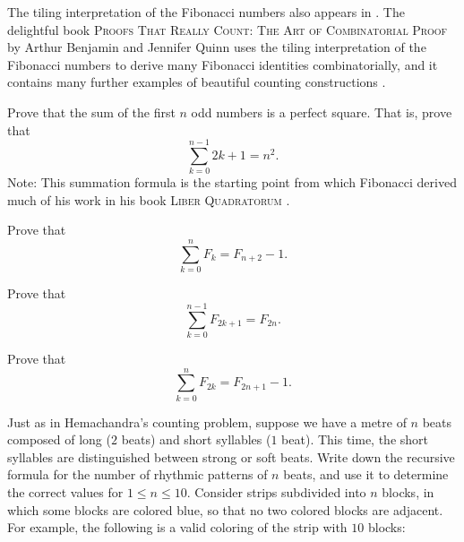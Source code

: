 The tiling interpretation of the Fibonacci numbers also appears in \cite{brigham1996}. The delightful book \textsc{Proofs That Really Count: The Art of Combinatorial Proof} by Arthur Benjamin and Jennifer Quinn uses the tiling interpretation of the Fibonacci numbers to derive many Fibonacci identities combinatorially, and it contains many further examples of beautiful counting constructions \cite{benjamin2003}.

\clearpage%

\exercises

\begin{starter}
  \exercise \label{exercise:sum-of-odd-numbers}Prove that the sum of the first $n$ odd numbers is a perfect square. That is, prove that
  \begin{equation*}
    \sum_{k=0}^{n-1} 2k+1 = n^2.
  \end{equation*}
  Note: This summation formula is the starting point from which Fibonacci derived much of his work in his book  \textsc{Liber Quadratorum} \cite{fibonacci1987}.
  \exercise
  \begin{subexenum}
  \item Prove that
    \begin{equation*}
      \sum_{k=0}^nF_k = F_{n+2}-1.
    \end{equation*}
  \item Prove that
    \begin{equation*}
      \sum_{k=0}^{n-1}F_{2k+1}=F_{2n}.
    \end{equation*}
  \item Prove that
    \begin{equation*}
      \sum_{k=0}^{n}F_{2k}=F_{2n+1}-1.
    \end{equation*}
  \end{subexenum}  
  \exercise Just as in Hemachandra's counting problem, suppose we have a metre of $n$ beats composed of long ($2$ beats) and short syllables ($1$ beat). This time, the short syllables are distinguished between strong or soft beats. Write down the recursive formula for the number of rhythmic patterns of $n$ beats, and use it to determine the correct values for $1\leq n\leq 10$.
  \exercise \label{exercise:hemachandra-variant}Consider strips subdivided into $n$ blocks, in which some blocks are colored blue, so that no two colored blocks are adjacent. For example, the following is a valid coloring of the strip with $10$ blocks:
  \begin{center}
\end{center}
\end{starter}
